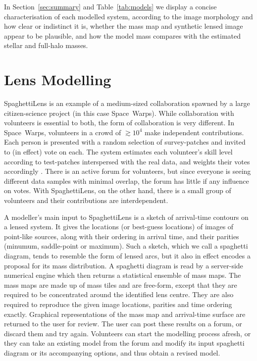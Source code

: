 \documentclass[fleqn,usenatbib]{mnras}
\begin{document}
In Section~\ref{sec:summary} and Table~\ref{tab:models} we display a
concise characterisation of each modelled system, according to the
image morphology and how clear or indistinct it is, whether the mass
map and synthetic lensed image appear to be plausible, and how the
model mass compares with the estimated stellar and full-halo masses.

\section{Lens Modelling}\label{sec:spl}

SpaghettiLens is an example of a medium-sized collaboration spawned by
a large citizen-science project (in this case Space~Warps).  While
collaboration with volunteers is essential to both, the form of
collaboration is very different.  In Space~Warps, volunteers in a
crowd of $\gtrsim10^4$ make independent contributions.  Each person is
presented with a random selection of survey-patches and invited to (in
effect) vote on each.  The system estimates each volunteer's skill
level according to test-patches interspersed with the real data, and
weights their votes accordingly \citep{2016MNRAS.455.1171M}.  There is
an active forum for volunteers, but since everyone is seeing different
data samples with minimal overlap, the forum has little if any
influence on votes.  With SpaghettiLens, on the other hand, there is a
small group of volunteers and their contributions are interdependent.

A modeller's main input to SpaghettiLens is a sketch of arrival-time
contours on a lensed system.  It gives the locations (or best-guess
locations) of images of point-like sources, along with their ordering
in arrival time, and their parities (minumum, saddle-point or
maximum).  Such a sketch, which we call a spaghetti diagram, tends to
resemble the form of lensed arcs, but it also in effect 
encodes a proposal for its mass distribution.  A spaghetti diagram is
read by a server-side numerical engine \citep[GLASS, developed
  by][]{2014MNRAS.445.2181C} which then returns a statistical ensemble
of mass maps.  The mass maps are made up of mass tiles and are
free-form, except that they are required to be concentrated around the
identified lens centre.  They are also required to reproduce the given
image locations, parities and time ordering exactly.  Graphical
representations of the mass map and arrival-time surface are returned
to the user for review.  The user can post these results on a forum,
or discard them and try again.  Volunteers can start the modelling
process afresh, or they can take an existing model from the forum and
modify its input spaghetti diagram or its accompanying options, and
thus obtain a revised model.
\end{document}
